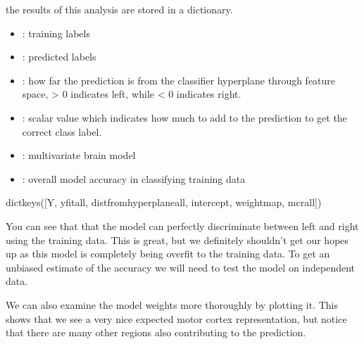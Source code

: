 \documentclass[letterpaper,10pt,english]{sphinxmanual}
\begin{document}
the results of this analysis are stored in a dictionary.
\begin{itemize}
\item {} 
: training labels

\item {} 
: predicted labels

\item {} 
: how far the prediction is from the classifier hyperplane through feature space, \textgreater{} 0 indicates left, while \textless{} 0 indicates right.

\item {} 
: scalar value which indicates how much to add to the prediction to get the correct class label.

\item {} 
: multivariate brain model

\item {} 
: overall model accuracy in classifying training data

\end{itemize}

\begin{sphinxVerbatim}[commandchars=\\\{\}]
\end{sphinxVerbatim}

\begin{sphinxVerbatim}[commandchars=\\\{\}]
dict\PYGZus{}keys([\PYGZsq{}Y\PYGZsq{}, \PYGZsq{}yfit\PYGZus{}all\PYGZsq{}, \PYGZsq{}dist\PYGZus{}from\PYGZus{}hyperplane\PYGZus{}all\PYGZsq{}, \PYGZsq{}intercept\PYGZsq{}, \PYGZsq{}weight\PYGZus{}map\PYGZsq{}, \PYGZsq{}mcr\PYGZus{}all\PYGZsq{}])
\end{sphinxVerbatim}

You can see that that the model can perfectly discriminate between left and right using the training data. This is great, but we definitely shouldn’t get our hopes up as this model is completely being overfit to the training data. To get an unbiased estimate of the accuracy we will need to test the model on independent data.

We can also examine the model weights more thoroughly by plotting it.  This shows that we see a very nice expected motor cortex representation, but notice that there are many other regions also contributing to the prediction.
\end{document}
